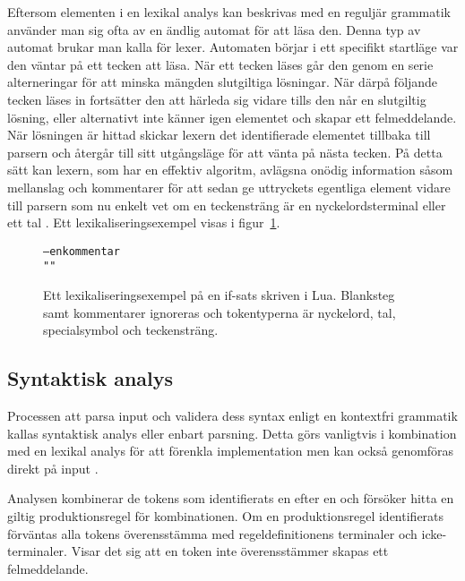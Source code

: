 Eftersom elementen i en lexikal analys kan beskrivas med en reguljär grammatik
använder man sig ofta av en ändlig automat för att läsa den. Denna typ av
automat brukar man kalla för lexer. Automaten börjar i ett specifikt startläge
var den väntar på ett tecken att läsa. När ett tecken läses går den genom en
serie alterneringar för att minska mängden slutgiltiga lösningar. När därpå
följande tecken läses in fortsätter den att härleda sig vidare tills den når
en slutgiltig lösning, eller alternativt inte känner igen elementet och skapar
ett felmeddelande. När lösningen är hittad skickar lexern det identifierade
elementet tillbaka till parsern och återgår till sitt utgångsläge för att
vänta på nästa tecken.  På detta sätt kan lexern, som har en effektiv
algoritm, avlägsna onödig information såsom mellanslag och kommentarer för att
sedan ge uttryckets egentliga element vidare till parsern som nu enkelt vet om
en teckensträng är en nyckelordsterminal eller ett tal \citep[s.  51]{sm09}.
Ett lexikaliseringsexempel visas i figur~\ref{fig:lexing}.

\begin{figure}[ht]
  \begin{alltt}
  \boxpunct{+}  \boxpunct{>}  \boxpunct{==}  
  -- en kommentar
   ""\boxpunct{;}
  \end{alltt}
  \caption{Ett lexikaliseringsexempel på en if-sats skriven i Lua.
    Blanksteg samt kommentarer ignoreras och tokentyperna är nyckelord, tal,
    specialsymbol och teckensträng.}
  \label{fig:lexing}
\end{figure}

\subsection{Syntaktisk analys}

Processen att parsa input och validera dess syntax enligt en kontextfri
grammatik kallas syntaktisk analys eller enbart parsning. Detta görs
vanligtvis i kombination med en lexikal analys för att förenkla
implementation men kan också genomföras direkt på input \citep[s. 8]{aa06}.

Analysen kombinerar de tokens som identifierats en efter en och försöker hitta
en giltig produktionsregel för kombinationen. Om en produktionsregel
identifierats förväntas alla tokens överensstämma med regeldefinitionens
terminaler och icke-terminaler. Visar det sig att en token inte överensstämmer
skapas ett felmeddelande.

